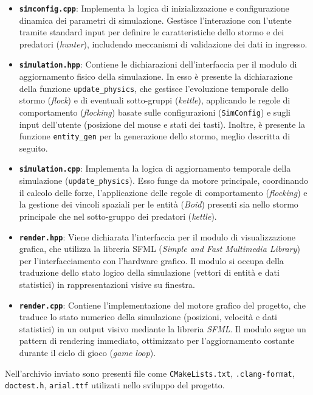 \documentclass[11pt, a4paper]{article}
\begin{document}
\begin{itemize}
    \item \textbf{\texttt{simconfig.cpp}}: Implementa la logica di inizializzazione e configurazione dinamica dei parametri di simulazione. Gestisce l'interazione con l'utente tramite standard input per definire le caratteristiche dello stormo e dei predatori (\textit{hunter}), includendo meccanismi di validazione dei dati in ingresso. 
    \item \textbf{\texttt{simulation.hpp}}: Contiene le dichiarazioni dell'interfaccia per il modulo di aggiornamento fisico della simulazione. In esso è presente la dichiarazione della funzione \texttt{update\_physics}, che gestisce l'evoluzione temporale dello stormo (\textit{flock}) e di eventuali sotto-gruppi (\textit{kettle}), applicando le regole di comportamento (\textit{flocking}) basate sulle configurazioni (\texttt{SimConfig}) e sugli input dell'utente (posizione del mouse e stati dei tasti). Inoltre, è presente la funzione \texttt{entity\_gen} per la generazione dello stormo, meglio descritta di seguito.
    \item \textbf{\texttt{simulation.cpp}}: Implementa la logica di aggiornamento temporale della simulazione 
    \newline (\texttt{update\_physics}). Esso funge da motore principale, coordinando il calcolo delle forze, l'applicazione delle regole di comportamento (\textit{flocking}) e la gestione dei vincoli spaziali per le entità (\textit{Boid}) presenti sia nello stormo principale che nel sotto-gruppo dei predatori (\textit{kettle}).
    \item \textbf{\texttt{render.hpp}}: Viene dichiarata l'interfaccia per il modulo di visualizzazione grafica, che utilizza la libreria SFML (\textit{Simple and Fast Multimedia Library}) per l'interfacciamento con l'hardware grafico. Il modulo si occupa della traduzione dello stato logico della simulazione (vettori di entità e dati statistici) in rappresentazioni visive su finestra.
    \item \textbf{\texttt{render.cpp}}: Contiene l'implementazione del motore grafico del progetto, che traduce lo stato numerico della simulazione (posizioni, velocità e dati statistici) in un output visivo mediante la libreria \textit{SFML}. Il modulo segue un pattern di rendering immediato, ottimizzato per l'aggiornamento costante durante il ciclo di gioco (\textit{game loop}).
\end{itemize}
Nell'archivio inviato sono presenti file come \texttt{CMakeLists.txt}, \texttt{.clang-format}, \texttt{doctest.h}, \newline \texttt{arial.ttf} utilizati nello sviluppo del progetto.
\end{document}
